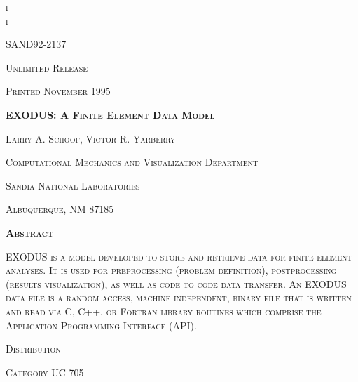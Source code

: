 \documentclass{article}
\newcommand{\tab}{\hspace{5mm}}
\begin{document}
\tab  {\nobreakspace}
\tab  \textsc{i\tab }{\nobreakspace}\\

\tab  {\nobreakspace}
 {\nobreakspace}\tab  \textsc{i}


\begin{center}
\textsc{SAND92-2137}


\end{center}

\begin{center}
\textsc{Unlimited Release}


\end{center}

\begin{center}
\textsc{Printed November 1995}


\end{center}

\begin{center}

\begin{spacing}{2.0}
\textbf{\textsc{{\LARGE EXODUS: A Finite Element Data Model}}}


\end{spacing}

\end{center}

\begin{center}
\textsc{Larry A. Schoof, Victor R. Yarberry}


\end{center}

\begin{center}
\textsc{Computational Mechanics and Visualization Department}


\end{center}

\begin{center}
\textsc{Sandia National Laboratories}


\end{center}

\begin{center}
\textsc{Albuquerque, NM 87185}


\end{center}

\begin{center}
\textbf{\textsc{{\large Abstract}}}


\end{center}

\textsc{EXODUS is a model developed to store and retrieve data 
for finite element analyses. It is used for preprocessing (problem 
definition), postprocessing (results visualization), as well 
as code to code data transfer. An EXODUS data file is a random 
access, machine independent, binary file that is written and 
read via C, C++, or Fortran library routines which comprise the 
Application Programming Interface (API).}



\begin{flushright}
\textsc{Distribution}


\end{flushright}

\begin{flushright}
\textsc{Category UC-705}
\end{flushright}
\end{document}
